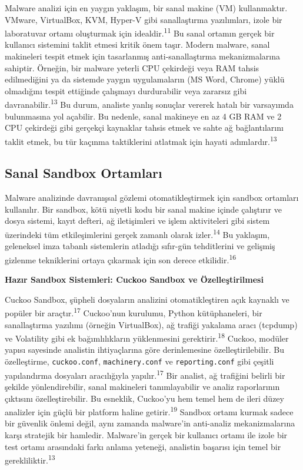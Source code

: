 Malware analizi için en yaygın yaklaşım, bir sanal makine (VM) kullanmaktır. VMware, VirtualBox, KVM, Hyper-V gibi sanallaştırma yazılımları, izole bir laboratuvar ortamı oluşturmak için idealdir.\textsuperscript{11} Bu sanal ortamın gerçek bir kullanıcı sistemini taklit etmesi kritik önem taşır. Modern malware, sanal makineleri tespit etmek için tasarlanmış anti-sanallaştırma mekanizmalarına sahiptir. Örneğin, bir malware yeterli CPU çekirdeği veya RAM tahsis edilmediğini ya da sistemde yaygın uygulamaların (MS Word, Chrome) yüklü olmadığını tespit ettiğinde çalışmayı durdurabilir veya zararsız gibi davranabilir.\textsuperscript{13} Bu durum, analiste yanlış sonuçlar vererek hatalı bir varsayımda bulunmasına yol açabilir. Bu nedenle, sanal makineye en az 4 GB RAM ve 2 CPU çekirdeği gibi gerçekçi kaynaklar tahsis etmek ve sahte ağ bağlantılarını taklit etmek, bu tür kaçınma taktiklerini atlatmak için hayati adımlardır.\textsuperscript{13}

\subsection{Sanal Sandbox Ortamları}

Malware analizinde davranışsal gözlemi otomatikleştirmek için sandbox ortamları kullanılır. Bir sandbox, kötü niyetli kodu bir sanal makine içinde çalıştırır ve dosya sistemi, kayıt defteri, ağ iletişimleri ve işlem aktiviteleri gibi sistem üzerindeki tüm etkileşimlerini gerçek zamanlı olarak izler.\textsuperscript{14} Bu yaklaşım, geleneksel imza tabanlı sistemlerin atladığı sıfır-gün tehditlerini ve gelişmiş gizlenme tekniklerini ortaya çıkarmak için son derece etkilidir.\textsuperscript{16}

\textbf{Hazır Sandbox Sistemleri: Cuckoo Sandbox ve Özelleştirilmesi}

Cuckoo Sandbox, şüpheli dosyaların analizini otomatikleştiren açık kaynaklı ve popüler bir araçtır.\textsuperscript{17} Cuckoo'nun kurulumu, Python kütüphaneleri, bir sanallaştırma yazılımı (örneğin VirtualBox), ağ trafiği yakalama aracı (tcpdump) ve Volatility gibi ek bağımlılıkların yüklenmesini gerektirir.\textsuperscript{18} Cuckoo, modüler yapısı sayesinde analistin ihtiyaçlarına göre derinlemesine özelleştirilebilir. Bu özelleştirme, \texttt{cuckoo.conf}, \texttt{machinery.conf} ve \texttt{reporting.conf} gibi çeşitli yapılandırma dosyaları aracılığıyla yapılır.\textsuperscript{17} Bir analist, ağ trafiğini belirli bir şekilde yönlendirebilir, sanal makineleri tanımlayabilir ve analiz raporlarının çıktısını özelleştirebilir. Bu esneklik, Cuckoo'yu hem temel hem de ileri düzey analizler için güçlü bir platform haline getirir.\textsuperscript{19} Sandbox ortamı kurmak sadece bir güvenlik önlemi değil, aynı zamanda malware'in anti-analiz mekanizmalarına karşı stratejik bir hamledir. Malware'in gerçek bir kullanıcı ortamı ile izole bir test ortamı arasındaki farkı anlama yeteneği, analistin başarısı için temel bir gerekliliktir.\textsuperscript{13}

